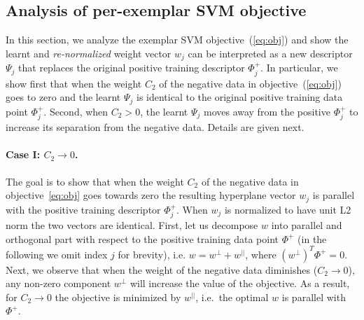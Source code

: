 \documentclass[10pt,twocolumn,letterpaper]{article}
\begin{document}
   \subsection*{Analysis of per-exemplar SVM objective} %
      In this section, we analyze the exemplar SVM objective~(\ref{eq:obj}) and show the learnt and {\em re-normalized} weight vector $w_j$ can be interpreted as a new descriptor $\Psi_j$ that replaces the original positive training descriptor $\Phi^+_j$.  In particular, we show first that when the weight $C_2$ of the negative data in objective~(\ref{eq:obj}) goes to zero and the learnt $\Psi_j$ is identical to the original positive training data point $\Phi_j^+$.  Second, when $C_2>0$, the learnt $\Psi_j$ moves away from the positive $\Phi_j^+$ to increase its separation from the negative data.
      Details are given next.

      \paragraph{Case I: $C_2\rightarrow 0$.}
         The goal is to show that when the weight  $C_2$ of the negative data in objective~\eqref{eq:obj} goes towards zero the resulting hyperplane vector $w_j$ is parallel with the positive training descriptor $\Phi_j^+$. When $w_j$ is normalized to have unit L2 norm the two vectors are identical. First, let us decompose $w$ into parallel and orthogonal part with respect to the positive training data point $\Phi^+$ (in the following we omit index $j$ for brevity), i.e. $w=w^{\perp}+w^{||}$, where $(w^{\perp})^T \Phi^+ = 0$. Next, we observe that when the weight of the negative data diminishes ($C_2\rightarrow 0$), any non-zero component $w^{\perp}$ will increase the value of the objective. As a result, for $C_2\rightarrow 0$ the objective is minimized by $w^{||}$, i.e.\ the optimal $w$ is parallel with $\Phi^+$.
\end{document}
